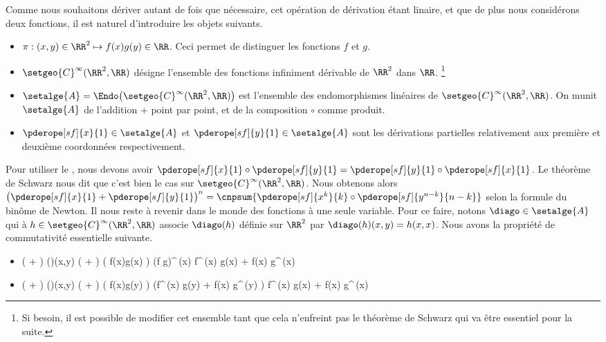 Comme nous souhaitons dériver autant de fois que nécessaire, cet opération de dérivation étant linaire, et que de plus nous considérons deux fonctions, il est naturel d'introduire les objets suivants.
%
\begin{itemize}
	\item $\pi: (x,y) \in \RR^2 \mapsto f(x) g(y) \in \RR$. Ceci permet de distinguer les fonctions $f$ et $g$.

	\item $\setgeo{C}^{\infty}(\RR^2 , \RR)$ désigne l'ensemble des fonctions infiniment dérivable de $\RR^2$ dans $\RR$.%
	\footnote{
		Si besoin, il est possible de modifier cet ensemble tant que cela n'enfreint pas le théorème de Schwarz qui va être essentiel pour la suite.
	}

	\item $\setalge{A} = \Endo \big( \setgeo{C}^{\infty}(\RR^2 , \RR) \big)$ est l'ensemble des endomorphismes linéaires de $\setgeo{C}^{\infty}(\RR^2 , \RR)$.
	On munit $\setalge{A}$ de l'addition $+$ point par point, et de la composition $\circ$ comme produit.

	\item $\pderope[sf]{x}{1} \in \setalge{A}$ et $\pderope[sf]{y}{1} \in \setalge{A}$ sont les dérivations partielles relativement aux première et deuxième coordonnées respectivement. 
\end{itemize}


Pour utiliser le , nous devons avoir $\pderope[sf]{x}{1} \circ \pderope[sf]{y}{1} = \pderope[sf]{y}{1} \circ \pderope[sf]{x}{1}$. Le théorème de Schwarz nous dit que c'est bien le cas sur $\setgeo{C}^{\infty}(\RR^2 , \RR)$.
%
Nous obtenons alors
$\big( \pderope[sf]{x}{1} + \pderope[sf]{y}{1} \big)^n = \cnpsum{ \pderope[sf]{x^k}{k} \circ \pderope[sf]{y^{n-k}}{n-k}}$
selon la formule du binôme de Newton.
%
Il nous reste à revenir dans le monde des fonctions à une seule variable. Pour ce faire, notons $\diago \in \setalge{A}$ qui à $h \in \setgeo{C}^{\infty}(\RR^2 , \RR)$ associe $\diago(h)$ définie sur $\RR^2$ par $\diago(h)(x,y) = h(x, x)$.
%
Nous avons la propriété de commutativité essentielle suivante.
%
\begin{itemize}
	\item
	\begin{stepcalc}[style=sar]
		\big(  +  \big) \circ \diago(\pi)(x,y)
	\explnext{}
		\big(  +  \big) \big( f(x)g(x) \big)
	\explnext{}
		(f g)^{\,\prime}(x)
	\explnext{}
		f^{\,\prime}(x) g(x) + f(x) g^{\,\prime}(x)
	\end{stepcalc}


	\item
	\begin{stepcalc}[style=sar]
		\diago \circ \big(  +  \big) (\pi)(x,y)
	\explnext{}
		\diago \circ \big(  +  \big) \big( f(x)g(y) \big)
	\explnext{}
		\diago \big(f^{\,\prime}(x) g(y) + f(x) g^{\,\prime}(y) \big)
	\explnext{}
		f^{\,\prime}(x) g(x) + f(x) g^{\,\prime}(x)
	\end{stepcalc}
\end{itemize}


